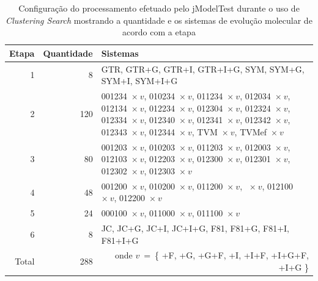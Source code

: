 \documentclass[english,brazilian]{UNISINOSmonografia} %
\newcommand\defaultFigureWidth{0.9}
\begin{document}
\begin{table}[tb]
\centering%
\begin{minipage}{\defaultFigureWidth\textwidth}
	\caption{Configuração do processamento efetuado pelo jModelTest durante o uso de \textit{Clustering Search} mostrando a quantidade e os sistemas de evolução molecular de acordo com a etapa}
	\label{tab:modelo-elasticidade-jmodelsteps}
	\small
	\vspace{1ex}
	\renewcommand {\tabularxcolumn}[1]{>{\arraybackslash}m{#1}} %
	\begin{tabularx}{\textwidth}{rrX@{}}
		\toprule
		Etapa & Quantidade & {Sistemas} \\ 
		\midrule
		1 & 8 &  GTR, GTR+G, GTR+I, GTR+I+G, \newline SYM, SYM+G, SYM+I, SYM+I+G  \\
		2 & 120 &  001234~$\times~v$, 010234~$\times~v$, 011234~$\times~v$, 012034~$\times~v$, 012134~$\times~v$, 012234~$\times~v$, 012304~$\times~v$, 012324~$\times~v$, 012334~$\times~v$, 012340~$\times~v$, 012341~$\times~v$, 012342~$\times~v$, 012343~$\times~v$, 012344~$\times~v$, \newline TVM~$\times~v$, TVMef~$\times~v$  \\
		3 & 80 &  001203~$\times~v$, 010203~$\times~v$, 011203~$\times~v$, 012003~$\times~v$, 012103~$\times~v$, 012203~$\times~v$, 012300~$\times~v$, 012301~$\times~v$, 012302~$\times~v$, 012303~$\times~v$  \\
		4 & 48 &  001200~$\times~v$, 010200~$\times~v$, 011200~$\times~v$, \newline 012000~$\times~v$, 012100~$\times~v$, 012200~$\times~v$  \\
		5 & 24 &  000100~$\times~v$, 011000~$\times~v$, 011100~$\times~v$  \\
		6 & 8 &  JC, JC+G, JC+I, JC+I+G, \newline F81, F81+G, F81+I, F81+I+G  \\
		\bottomrule
		Total & 288 & \multicolumn{1}{r}{onde $ v~=~${\small \{ +F, +G, +G+F, +I, +I+F, +I+G+F, +I+G \}}} \\ 
	\end{tabularx}
\end{minipage}
\end{table}
\end{document}
